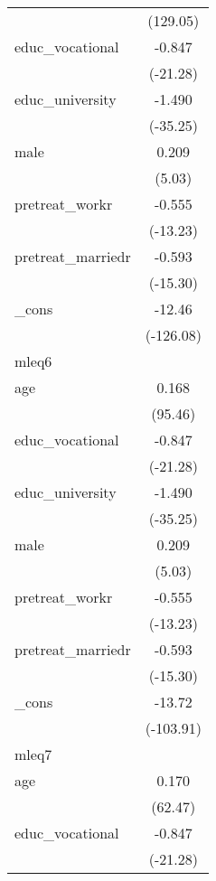 {\begin{tabular}{l*{1}{c}}
            &    (129.05)         \\
[1em]
educ\_vocational&      -0.847\sym{***}\\
            &    (-21.28)         \\
[1em]
educ\_university&      -1.490\sym{***}\\
            &    (-35.25)         \\
[1em]
male        &       0.209\sym{***}\\
            &      (5.03)         \\
[1em]
pretreat\_workr&      -0.555\sym{***}\\
            &    (-13.23)         \\
[1em]
pretreat\_marriedr&      -0.593\sym{***}\\
            &    (-15.30)         \\
[1em]
\_cons      &      -12.46\sym{***}\\
            &   (-126.08)         \\
\hline
mleq6       &                     \\
age         &       0.168\sym{***}\\
            &     (95.46)         \\
[1em]
educ\_vocational&      -0.847\sym{***}\\
            &    (-21.28)         \\
[1em]
educ\_university&      -1.490\sym{***}\\
            &    (-35.25)         \\
[1em]
male        &       0.209\sym{***}\\
            &      (5.03)         \\
[1em]
pretreat\_workr&      -0.555\sym{***}\\
            &    (-13.23)         \\
[1em]
pretreat\_marriedr&      -0.593\sym{***}\\
            &    (-15.30)         \\
[1em]
\_cons      &      -13.72\sym{***}\\
            &   (-103.91)         \\
\hline
mleq7       &                     \\
age         &       0.170\sym{***}\\
            &     (62.47)         \\
[1em]
educ\_vocational&      -0.847\sym{***}\\
            &    (-21.28)         \\

\end{tabular}}
